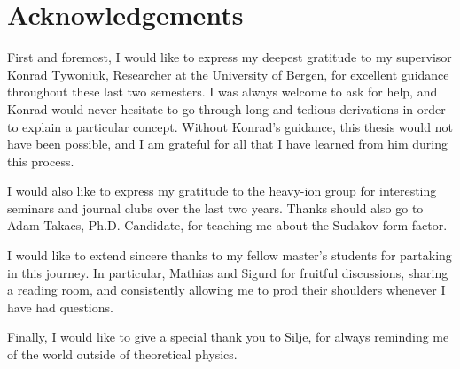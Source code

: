 \documentclass[main.tex]{subfiles}
\begin{document}
\chapter*{Acknowledgements}\label{cpt:ack}
First and foremost, I would like to express my deepest gratitude to my supervisor Konrad Tywoniuk, Researcher at the University of Bergen, for excellent guidance throughout these last two semesters. I was always welcome to ask for help, and Konrad would never hesitate to go through long and tedious derivations in order to explain a particular concept. Without Konrad's guidance, this thesis would not have been possible, and I am grateful for all that I have learned from him during this process.

I would also like to express my gratitude to the heavy-ion group for interesting seminars and journal clubs over the last two years. Thanks should also go to Adam Takacs, Ph.D. Candidate, for teaching me about the Sudakov form factor.

I would like to extend sincere thanks to my fellow master's students for partaking in this journey. In particular, Mathias and Sigurd for fruitful discussions, sharing a reading room, and consistently allowing me to prod their shoulders whenever I have had questions. 

Finally, I would like to give a special thank you to Silje, for always reminding me of the world outside of theoretical physics.
\end{document}
